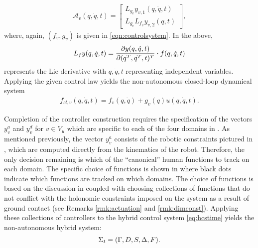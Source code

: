 \begin{align*}
  \mathcal{A}_{v}(q, {\dot q},t) =
  \left[\begin{array}{c}
      L_{g_{v}} y_{v,1} (q, {\dot q}, t)\\
      L_{g_{v}} L_{f_{v}} y_{v,2}(q,t)
    \end{array}\right],
\end{align*}
where, again, $(f_{v},g_{v})$ is given in \eqref{eqn:controlsystem}. In the above,
\begin{align}
  L_{f} y(q, {\dot q}, t) = \frac{\partial{y(q, {\dot q}, t)}}{\partial{(q^T, {\dot q}^T, t)^T}} \cdot f(q, \dot q, t)
\end{align} represents the Lie derivative with $q, {\dot q}, t$ representing independent variables.
Applying the given control law yields the non-autonomous closed-loop dynamical system
\begin{align}
  \label{eq:clsys}
  f_\mathit{cl,v}(q, {\dot q},t) = f_v(q, {\dot q}) + g_v(q) u(q, {\dot q}, t).
\end{align}

Completion of the controller construction requires the specification of the vectors $y^{a}_{v}$ and $y^{d}_{v}$ for $v \in V_u$ which are specific to each of the four domains in . As mentioned previously, the vector $y^a_v$ consists of the robotic constraints pictured in , which are computed directly from the kinematics of the robot. Therefore, the only decision remaining is which of the ``canonical'' human functions to track on each domain. The specific choice of functions is shown in  where black dots indicate which functions are tracked on which domains. The choice of functions is based on the discussion in  coupled with choosing collections of functions that do not conflict with the holonomic constraints imposed on the system as a result of ground contact (see Remarks \ref{rmk:actuation} and \ref{rmk:dimconst}). Applying these collections of controllers to the hybrid control system \eqref{eq:hcstime} yields the non-autonomous hybrid system:
\begin{align}
  \label{eq:hstime}
  \Sigma_t = (\Gamma, D, S, \Delta, F).
\end{align}

